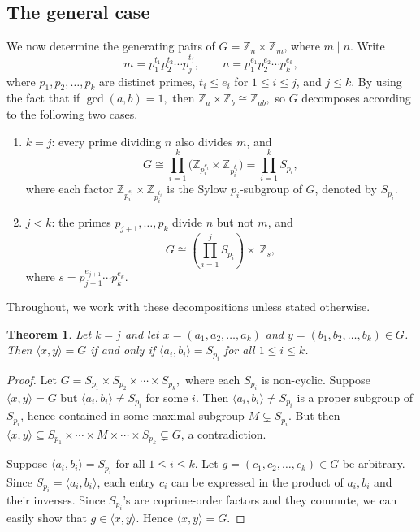 \documentclass[11pt]{article}
\def \Z {{\mathbb Z}}
\newtheorem{theorem}{Theorem}[section]
\begin{document}
\subsection{The general case}  
We now determine the generating pairs of $G = \mathbb{Z}_n \times \mathbb{Z}_m$, 
where $m \mid n$. Write
\[
  m = p_1^{t_1} p_2^{t_2} \cdots p_j^{t_j}, \qquad 
  n = p_1^{e_1} p_2^{e_2} \cdots p_k^{e_k},
\]
where $p_1, p_2, \ldots, p_k$ are distinct primes, $t_i \leq e_i$ for 
$1 \leq i \leq j$, and $j \leq k$. By using the fact that if $\gcd(a,b)=1,$ then $\Z_a\times \Z_b\cong \Z_{ab},$ so $G$ 
decomposes according to the following two cases.

\begin{enumerate}[label=(\alph*)]
    \item $k = j$: every prime dividing $n$ also divides $m$, and
    \[
      G \cong \prod_{i=1}^{k} 
      \bigl(\mathbb{Z}_{p_i^{e_i}} \times \mathbb{Z}_{p_i^{t_i}}\bigr)= \prod_{i=1}^{k} 
     S_{p_i},
    \]
   where each factor $\mathbb{Z}_{p_i^{e_i}} \times \mathbb{Z}_{p_i^{t_i}}$ 
    is the Sylow $p_i$-subgroup of $G$, denoted by $S_{p_i}$.
    
    \item $j < k$: the primes $p_{j+1}, \ldots, p_k$ divide $n$ but not $m$, 
    and
    \[
      G \cong \left(\prod_{i=1}^{j} 
      S_{p_i}\right) 
      \times \,\mathbb{Z}_s,
    \]
    where $s = p_{j+1}^{e_{j+1}} \cdots p_k^{e_k}$.
\end{enumerate}
Throughout, we work with these decompositions unless stated otherwise. 

\begin{theorem}\label{thm:agen}
Let $k = j$ and let $x = (a_1, a_2, \ldots, a_k)$ and 
$y = (b_1, b_2 ,\ldots, b_k) \in G$.
Then $\langle x, y \rangle = G$ if and only if 
$\langle a_i, b_i \rangle = S_{p_i}$ 
for all $1 \leq i \leq k$.
\end{theorem}
    \begin{proof}
        Let $G = S_{p_1} \times S_{p_2} \times \cdots \times S_{p_k},$ where each $S_{p_i}$ is non-cyclic.
         Suppose $\langle x, y \rangle = G$ but 
        $\langle a_i,b_i\rangle \neq S_{p_i}$ for some $i$. 
        Then $\langle a_i,b_i\rangle \neq S_{p_i}$ is a proper subgroup of 
        $S_{p_i}$, hence contained in some maximal subgroup $M \subsetneq S_{p_i}$. 
        But then $\langle x, y \rangle \subseteq S_{p_1} \times \cdots \times M 
        \times \cdots \times S_{p_k} \subsetneq G$, a contradiction.
        
    Suppose $\langle a_i,b_i \rangle = S_{p_i}$ 
        for all $1 \leq i \leq k$. Let $g = (c_1, c_2, \ldots, c_k) \in G$ 
        be arbitrary. Since $S_{p_i} = \langle a_i, b_i \rangle$, 
        each entry $c_i$ can be expressed in the product of
        $a_i,b_i$ and their inverses. Since $S_{p_i}$'s are 
        coprime-order factors and they commute, we can easily show that
        $g \in \langle x, y \rangle$. Hence $\langle x, y \rangle = G$.
        \end{proof}
\end{document}
